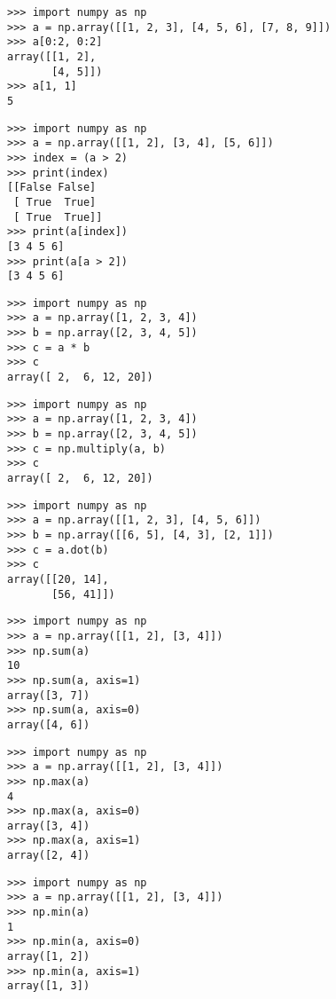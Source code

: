 \documentclass[10pt,a4paper]{ctexbook}
\begin{document}
\begin{verbatim}
>>> import numpy as np
>>> a = np.array([[1, 2, 3], [4, 5, 6], [7, 8, 9]])
>>> a[0:2, 0:2]
array([[1, 2],
       [4, 5]])
>>> a[1, 1]
5
\end{verbatim}


\begin{verbatim}
>>> import numpy as np
>>> a = np.array([[1, 2], [3, 4], [5, 6]])
>>> index = (a > 2)
>>> print(index)
[[False False]
 [ True  True]
 [ True  True]]
>>> print(a[index])
[3 4 5 6]
>>> print(a[a > 2])
[3 4 5 6]
\end{verbatim}


\begin{verbatim}
>>> import numpy as np
>>> a = np.array([1, 2, 3, 4])
>>> b = np.array([2, 3, 4, 5])
>>> c = a * b
>>> c
array([ 2,  6, 12, 20])
\end{verbatim}

\begin{verbatim}
>>> import numpy as np
>>> a = np.array([1, 2, 3, 4])
>>> b = np.array([2, 3, 4, 5])
>>> c = np.multiply(a, b)
>>> c
array([ 2,  6, 12, 20])
\end{verbatim}

\begin{verbatim}
>>> import numpy as np
>>> a = np.array([[1, 2, 3], [4, 5, 6]])
>>> b = np.array([[6, 5], [4, 3], [2, 1]])
>>> c = a.dot(b)
>>> c
array([[20, 14],
       [56, 41]])
\end{verbatim}

\begin{verbatim}
>>> import numpy as np
>>> a = np.array([[1, 2], [3, 4]])
>>> np.sum(a)
10
>>> np.sum(a, axis=1)
array([3, 7])
>>> np.sum(a, axis=0)
array([4, 6])
\end{verbatim}

\begin{verbatim}
>>> import numpy as np
>>> a = np.array([[1, 2], [3, 4]])
>>> np.max(a)
4
>>> np.max(a, axis=0)
array([3, 4])
>>> np.max(a, axis=1)
array([2, 4])
\end{verbatim}

\begin{verbatim}
>>> import numpy as np
>>> a = np.array([[1, 2], [3, 4]])
>>> np.min(a)
1
>>> np.min(a, axis=0)
array([1, 2])
>>> np.min(a, axis=1)
array([1, 3])
\end{verbatim}
\end{document}
